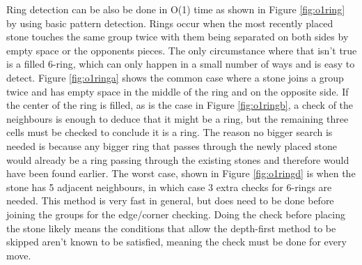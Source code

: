 Ring detection can be also be done in O(1) time as shown in Figure \ref{fig:o1ring} by using basic pattern detection. Rings occur when the most recently placed stone touches the same group twice with them being separated on both sides by empty space or the opponents pieces. The only circumstance where that isn't true is a filled 6-ring, which can only happen in a small number of ways and is easy to detect. Figure \ref{fig:o1ringa} shows the common case where a stone joins a group twice and has empty space in the middle of the ring and on the opposite side. If the center of the ring is filled, as is the case in Figure \ref{fig:o1ringb}, a check of the neighbours is enough to deduce that it might be a ring, but the remaining three cells must be checked to conclude it is a ring. The reason no bigger search is needed is because any bigger ring that passes through the newly placed stone would already be a ring passing through the existing stones and therefore would have been found earlier. The worst case, shown in Figure \ref{fig:o1ringd} is when the stone has 5 adjacent neighbours, in which case 3 extra checks for 6-rings are needed. This method is very fast in general, but does need to be done before joining the groups for the edge/corner checking. Doing the check before placing the stone likely means the conditions that allow the depth-first method to be skipped aren't known to be satisfied, meaning the check must be done for every move.

